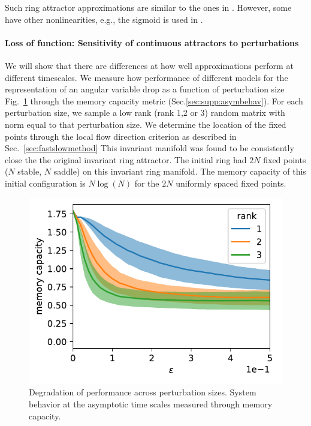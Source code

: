 \documentclass{article} %
\newcounter{ct}
\theoremstyle{definition}
\theoremstyle{remark}
\begin{document}
 Such ring attractor approximations are similar to the ones in \citep{goodridge2000, samsonovich1997path, redish1996coupled, tsodyks1995associative}. %
However, some have other nonlinearities, e.g.,  the sigmoid is used in \citep{goodridge2000}.


\paragraph{Loss of function: Sensitivity of continuous attractors to perturbations}\label{sec:supp:boa}
We will show that there are differences at how well approximations perform at different timescales.
We measure how performance of different models for the representation of an angular variable drop as a function of perturbation size Fig.~\ref{fig:performance} through the memory capacity metric (Sec.\ref{sec:supp:asymbehav}).
For each perturbation size, we sample a low rank (rank 1,2 or 3) random matrix with norm equal to that perturbation size.
We determine the location of the fixed points through the local flow direction criterion as described in Sec.~\ref{sec:fastslowmethod}
This invariant manifold was found to be consistently close the the original invariant ring attractor.
The initial ring had \(2N\) fixed points (\(N\) stable, \(N\) saddle) on this invariant ring manifold.
The memory capacity of this initial configuration is \(N\log(N)\) for the \(2N\) uniformly spaced fixed points.

\begin{figure}[tbhp]
  \centering
  \includegraphics[width=\textwidth]{performance2}
  \caption{Degradation of performance across perturbation sizes. System behavior at the asymptotic time scales measured through memory capacity. }
  \label{fig:performance}
\end{figure}
\end{document}
